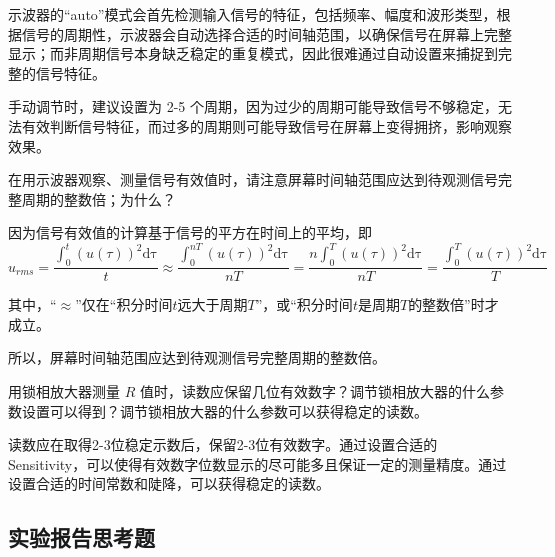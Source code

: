 \documentclass[dvipsnames, svgnames,a4paper,11pt]{article}
\begin{document}
		示波器的“auto”模式会首先检测输入信号的特征，包括频率、幅度和波形类型，根据信号的周期性，示波器会自动选择合适的时间轴范围，以确保信号在屏幕上完整显示；而非周期信号本身缺乏稳定的重复模式，因此很难通过自动设置来捕捉到完整的信号特征。

		手动调节时，建议设置为 2-5 个周期，因为过少的周期可能导致信号不够稳定，无法有效判断信号特征，而过多的周期则可能导致信号在屏幕上变得拥挤，影响观察效果。



		\begin{tcolorbox}[colback=yellow!20, colframe=black!75, title=【问题 14】]
			在用示波器观察、测量信号有效值时，请注意屏幕时间轴范围应达到待观测信号完整周期的整数倍；为什么？
		\end{tcolorbox}

		因为信号有效值的计算基于信号的平方在时间上的平均，即
		\[
			u_{rms} = \frac{\int_0^{t} (u(\tau))^2 \mathrm{d\tau}}{t} \approx \frac{\int_0^{nT} (u(\tau))^2 \mathrm{d\tau}}{nT} = \frac{n\int_0^{T} (u(\tau))^2 \mathrm{d\tau}}{nT} = \frac{\int_0^{T} (u(\tau))^2 \mathrm{d\tau}}{T}
		\]

		其中，“$\approx$”仅在“积分时间$t$远大于周期$T$”，或“积分时间$t$是周期$T$的整数倍”时才成立。

		所以，屏幕时间轴范围应达到待观测信号完整周期的整数倍。



		\begin{tcolorbox}[colback=yellow!20, colframe=black!75, title=【问题 15】]
			用锁相放大器测量 $R$ 值时，读数应保留几位有效数字？调节锁相放大器的什么参数设置可以得到？调节锁相放大器的什么参数可以获得稳定的读数。
		\end{tcolorbox}

		读数应在取得2-3位稳定示数后，保留2-3位有效数字。通过设置合适的Sensitivity，可以使得有效数字位数显示的尽可能多且保证一定的测量精度。通过设置合适的时间常数和陡降，可以获得稳定的读数。






\clearpage
\subsection{实验报告思考题}
\end{document}
